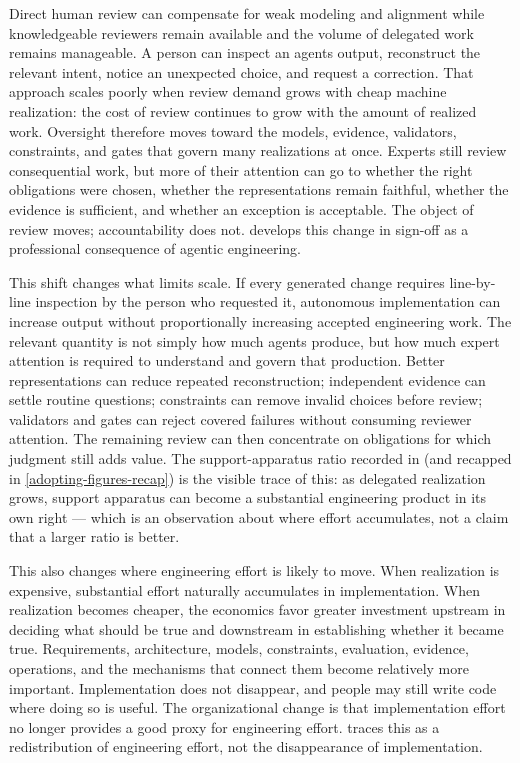 

Direct human review can compensate for weak modeling and alignment while knowledgeable reviewers remain available and the volume of delegated work remains manageable. A person can inspect an agent\textquotesingle s output, reconstruct the relevant intent, notice an unexpected choice, and request a correction. That approach scales poorly when review demand grows with cheap machine realization: the cost of review continues to grow with the amount of realized work. Oversight therefore moves toward the models, evidence, validators, constraints, and gates that govern many realizations at once. Experts still review consequential work, but more of their attention can go to whether the right obligations were chosen, whether the representations remain faithful, whether the evidence is sufficient, and whether an exception is acceptable. The object of review moves; accountability does not.  develops this change in sign-off as a professional consequence of agentic engineering.

This shift changes what limits scale. If every generated change requires line-by-line inspection by the person who requested it, autonomous implementation can increase output without proportionally increasing accepted engineering work. The relevant quantity is not simply how much agents produce, but how much expert attention is required to understand and govern that production. Better representations can reduce repeated reconstruction; independent evidence can settle routine questions; constraints can remove invalid choices before review; validators and gates can reject covered failures without consuming reviewer attention. The remaining review can then concentrate on obligations for which judgment still adds value. The support-apparatus ratio recorded in  (and recapped in \autoref{adopting-figures-recap}) is the visible trace of this: as delegated realization grows, support apparatus can become a substantial engineering product in its own right --- which is an observation about where effort accumulates, not a claim that a larger ratio is better.

This also changes where engineering effort is likely to move. When realization is expensive, substantial effort naturally accumulates in implementation. When realization becomes cheaper, the economics favor greater investment upstream in deciding what should be true and downstream in establishing whether it became true. Requirements, architecture, models, constraints, evaluation, evidence, operations, and the mechanisms that connect them become relatively more important. Implementation does not disappear, and people may still write code where doing so is useful. The organizational change is that implementation effort no longer provides a good proxy for engineering effort.  traces this as a redistribution of engineering effort, not the disappearance of implementation.

